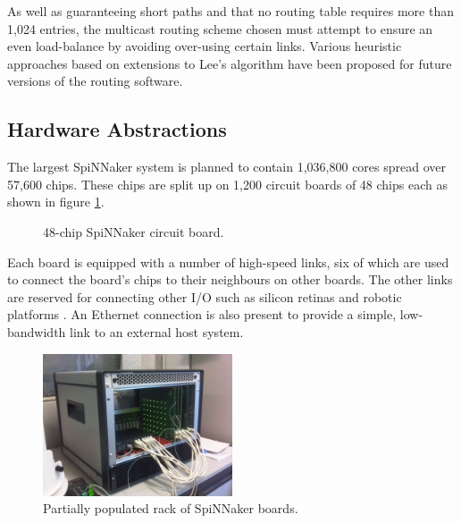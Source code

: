 				As well as guaranteeing short paths and that no routing table requires
				more than 1,024 entries, the multicast routing scheme chosen must
				attempt to ensure an even load-balance by avoiding over-using certain
				links. Various heuristic approaches based on extensions to Lee's
				algorithm have been proposed for future versions of the routing
				software\cite{davidson13}.
		
		\subsection{Hardware Abstractions}
			
			
			The largest SpiNNaker system is planned to contain 1,036,800 cores spread
			over 57,600 chips.  These chips are split up on 1,200 circuit boards of
			48 chips each as shown in figure \ref{fig:spinn4labelled}.
			
			\begin{figure}[p!]
				\center
				
				\caption{48-chip SpiNNaker circuit board.}
				\label{fig:spinn4labelled}
			\end{figure}
			
			Each board is equipped with a number of high-speed links, six of which are
			used to connect the board's chips to their neighbours on other boards. The
			other links are reserved for connecting other I/O such as silicon retinas
			and robotic platforms \cite{davies10}. An Ethernet connection is also
			present to provide a simple, low-bandwidth link to an external host
			system.
			
			\begin{figure}[p!]
				\center
				\includegraphics[width=0.5\textwidth]{figures/spiNNaker103.jpg}
				\caption{Partially populated rack of SpiNNaker boards.}
				\label{fig:spiNNaker103}
			\end{figure}
			
